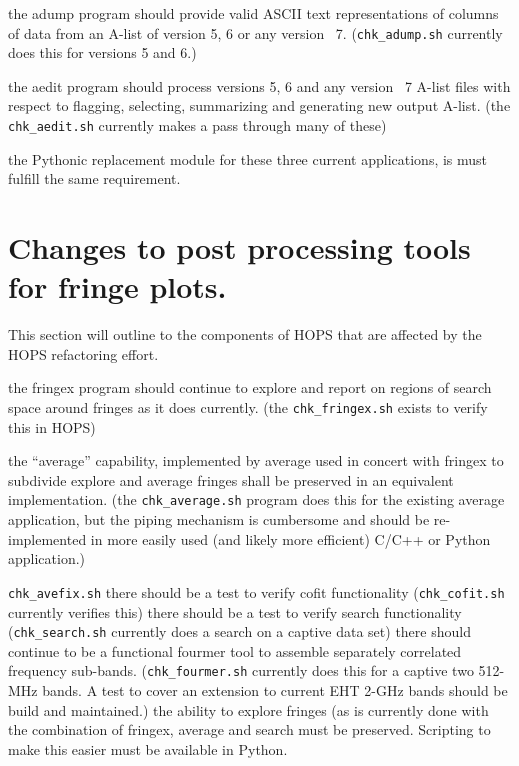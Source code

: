\begin{description}
 the \acs{adump} program should provide valid ASCII text
    representations of columns of data from an \acs{A-list} of version
    5, 6 or any version \TBD~7.
    (\texttt{chk\_adump.sh} currently does this for versions 5 and 6.)

 the \acs{aedit} program should process versions 5, 6 and
    any version \TBD~7 \acs{A-list} files with respect to flagging,
    selecting, summarizing and generating new output \acs{A-list}.
    (the \texttt{chk\_aedit.sh} currently makes a pass through many
    of these)

 the \acs{Python}ic replacement module for these three current
    applications, is must fulfill the same requirement.

\section{Changes to post processing tools for fringe plots.}
  This section will outline to the components of HOPS that are affected by the HOPS refactoring effort.

\begin{description}
   the \acs{fringex} program should continue to explore and report
      on regions of search space around fringes as it does currently.
      (the \texttt{chk\_fringex.sh} exists to verify this in \acs{HOPS})

   the ``average'' capability, implemented by \ac{average}
      used in concert with \ac{fringex} to subdivide explore and average
      fringes shall be preserved in an equivalent implementation.
      (the \texttt{chk\_average.sh} program does this for the existing
      \ac{average} application, but the piping mechanism is cumbersome
      and should be re-implemented in more easily used (and likely more
      efficient) C/C++ or \ac{Python} application.)

      \texttt{chk\_avefix.sh}
   there should be a test to verify \acs{cofit} functionality
      (\texttt{chk\_cofit.sh} currently verifies this)
   there should be a test to verify \acs{search} functionality
      (\texttt{chk\_search.sh} currently does a search on a captive
      data set)
   there should continue to be a functional \acs{fourmer} tool
      to assemble separately correlated frequency sub-bands.
      (\texttt{chk\_fourmer.sh} currently does this for a
      captive two 512-MHz bands.  A test to cover an extension
      to current \acs{EHT} 2-GHz bands should be build and maintained.)
 the ability to explore fringes (as is currently done with
    the combination of \ac{fringex}, \ac{average} and search must be
    preserved.  Scripting to make this easier must be available in
    \ac{Python}.


\end{description}
\end{description}
